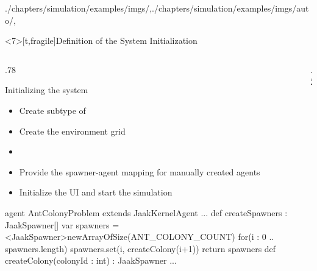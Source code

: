 \begin{graphicspathcontext}{{./chapters/simulation/examples/imgs/},{./chapters/simulation/examples/imgs/auto/},\old}
\begin{frame}<7>[t,fragile]{Definition of the System Initialization \insertcontinuationtext}
	\vspace{-.5cm}
	\smaller
	\begin{columns}
		\begin{column}[t]{.78\linewidth}
			{\smaller
			\begin{block}{Initializing the system}
				\begin{itemize}
				\item Create subtype of 
				\item Create the environment grid
				\item {}
				\item Provide the spawner-agent mapping for manually created agents
				\item Initialize the UI and start the simulation
				\end{itemize}
			\end{block}}
			\begin{sarllisting}[basicstyle=\scriptsize]
agent AntColonyProblem extends JaakKernelAgent {
...
  def createSpawners : JaakSpawner[] {
    var spawners = <JaakSpawner>newArrayOfSize(ANT_COLONY_COUNT)
    for(i : 0 .. spawners.length)
      spawners.set(i, createColony(i+1))
    return spawners
  }
  def createColony(colonyId : int) : JaakSpawner {
    ...
  }
}
			\end{sarllisting}
		\end{column}
		\begin{column}[t]{.2\linewidth}
		\end{column}
	\end{columns}
\end{frame}


\end{graphicspathcontext}
